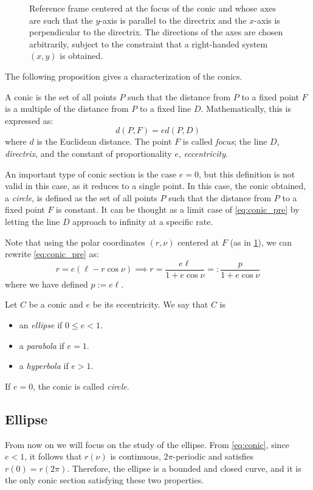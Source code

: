 \documentclass[../main.tex]{subfiles}
\begin{document}
\begin{figure}[htbp]
\begin{minipage}[ht]{0.45\textwidth}
    \caption{Reference frame centered at the focus of the conic and whose axes are such that the $y$-axis is parallel to the directrix and the $x$-axis is perpendicular to the directrix. The directions of the axes are chosen arbitrarily, subject to the constraint that a right-handed system $(x,y)$ is obtained.}
    \label{fig:conics_cartesian}
  \end{minipage}
\end{figure}
The following proposition gives a characterization of the conics.
\begin{proposition}
  A conic is the set of all points $P$ such that the distance from $P$ to a fixed point $F$ is a multiple of the distance from $P$ to a fixed line $D$. Mathematically, this is expressed as:
  \begin{equation}\label{eq:conic_pre}
    d(P,F)=e d(P,D)
  \end{equation}
  where $d$ is the Euclidean distance. The point $F$ is called \emph{focus}; the line $D$, \emph{directrix}, and the constant of proportionality $e$, \emph{eccentricity}.
\end{proposition}
An important type of conic section is the case $e=0$, but this definition is not valid in this case, as it reduces to a single point. In this case, the conic obtained, a \emph{circle}, is defined as the set of all points $P$ such that the distance from $P$ to a fixed point $F$ is constant. It can be thought as a limit case of \cref{eq:conic_pre} by letting the line $D$ approach to infinity at a specific rate.

Note that using the polar coordinates $(r,\nu)$ centered at $F$ (as in \cref{fig:conics_cartesian}), we can rewrite \cref{eq:conic_pre} as:
\begin{equation}\label{eq:conic}
  r=e(\ell - r\cos\nu)\implies r= \frac{e\ell}{1+e\cos\nu}=:\frac{p}{1+e\cos\nu}
\end{equation}
where we have defined $p:=e\ell$.
\begin{definition}
  Let $C$ be a conic and $e$ be its eccentricity. We say that $C$ is
  \begin{itemize}
    \item an \emph{ellipse} if $0\leq e<1$.
    \item a \emph{parabola} if $e=1$.
    \item a \emph{hyperbola} if $e>1$.
  \end{itemize}
  If $e=0$, the conic is called \emph{circle}.
\end{definition}
\subsection{Ellipse}\label{sec:ellipse}
From now on we will focus on the study of the ellipse. From \cref{eq:conic}, since $e<1$, it follows that $r(\nu)$ is continuous, $2\pi$-periodic and satisfies $r(0)=r(2\pi)$. Therefore, the ellipse is a bounded and closed curve, and it is the only conic section satisfying these two properties.
\end{document}
